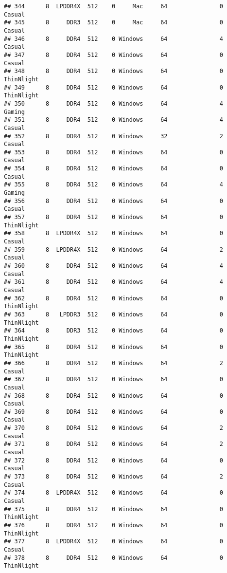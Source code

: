 \documentclass[
]{article}
\begin{document}
\begin{verbatim}
## 344      8  LPDDR4X  512    0     Mac     64               0     Casual
## 345      8     DDR3  512    0     Mac     64               0     Casual
## 346      8     DDR4  512    0 Windows     64               4     Casual
## 347      8     DDR4  512    0 Windows     64               0     Casual
## 348      8     DDR4  512    0 Windows     64               0 ThinNlight
## 349      8     DDR4  512    0 Windows     64               0 ThinNlight
## 350      8     DDR4  512    0 Windows     64               4     Gaming
## 351      8     DDR4  512    0 Windows     64               4     Casual
## 352      8     DDR4  512    0 Windows     32               2     Casual
## 353      8     DDR4  512    0 Windows     64               0     Casual
## 354      8     DDR4  512    0 Windows     64               0     Casual
## 355      8     DDR4  512    0 Windows     64               4     Gaming
## 356      8     DDR4  512    0 Windows     64               0     Casual
## 357      8     DDR4  512    0 Windows     64               0 ThinNlight
## 358      8  LPDDR4X  512    0 Windows     64               0     Casual
## 359      8  LPDDR4X  512    0 Windows     64               2     Casual
## 360      8     DDR4  512    0 Windows     64               4     Casual
## 361      8     DDR4  512    0 Windows     64               4     Casual
## 362      8     DDR4  512    0 Windows     64               0 ThinNlight
## 363      8   LPDDR3  512    0 Windows     64               0 ThinNlight
## 364      8     DDR3  512    0 Windows     64               0 ThinNlight
## 365      8     DDR4  512    0 Windows     64               0 ThinNlight
## 366      8     DDR4  512    0 Windows     64               2     Casual
## 367      8     DDR4  512    0 Windows     64               0     Casual
## 368      8     DDR4  512    0 Windows     64               0     Casual
## 369      8     DDR4  512    0 Windows     64               0     Casual
## 370      8     DDR4  512    0 Windows     64               2     Casual
## 371      8     DDR4  512    0 Windows     64               2     Casual
## 372      8     DDR4  512    0 Windows     64               0     Casual
## 373      8     DDR4  512    0 Windows     64               2     Casual
## 374      8  LPDDR4X  512    0 Windows     64               0     Casual
## 375      8     DDR4  512    0 Windows     64               0 ThinNlight
## 376      8     DDR4  512    0 Windows     64               0 ThinNlight
## 377      8  LPDDR4X  512    0 Windows     64               0     Casual
## 378      8     DDR4  512    0 Windows     64               0 ThinNlight

\end{verbatim}
\end{document}
